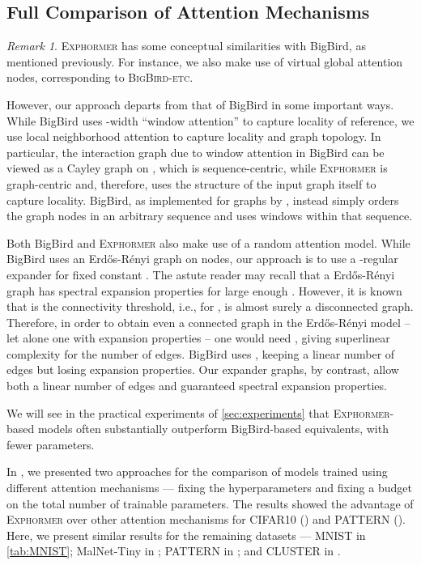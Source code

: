 \documentclass{article}
\theoremstyle{plain}
\theoremstyle{definition}
\theoremstyle{remark}
\newtheorem{remark}[theorem]{Remark}
\begin{document}
\subsection{Full Comparison of Attention Mechanisms} \label{app:attncomp}
\begin{remark}
\textsc{Exphormer} has some conceptual similarities with BigBird, as mentioned previously. For instance, we also make use of virtual global attention nodes, corresponding to \textsc{BigBird-etc}.

However, our approach departs from that of BigBird in some important ways. While BigBird uses -width ``window attention'' to capture locality of reference, we use local neighborhood attention to capture locality and graph topology. In particular, the interaction graph due to window attention in BigBird can be viewed as a Cayley graph on , which is sequence-centric, while \textsc{Exphormer} is graph-centric and, therefore, uses the structure of the input graph itself to capture locality.
BigBird, as implemented for graphs by \citet{RampasekGDLWB22}, instead simply orders the graph nodes in an arbitrary sequence and uses windows within that sequence.

Both BigBird and \textsc{Exphormer} also make use of a random attention model. While BigBird uses an Erd\H{o}s-R\'{e}nyi graph on  nodes, our approach is to use a -regular expander for fixed constant . The astute reader may recall that a Erd\H{o}s-R\'{e}nyi graph  has spectral expansion properties for large enough . However, it is known that  is the connectivity threshold, i.e., for ,  is almost surely a disconnected graph. Therefore, in order to obtain even a connected graph in the Erd\H{o}s-R\'{e}nyi model -- let alone one with expansion properties -- one would need , giving superlinear complexity for the number of edges.
BigBird uses , keeping a linear number of edges but losing expansion properties.
Our expander graphs, by contrast, allow both a linear number of edges and guaranteed spectral expansion properties.

We will see in the practical experiments of \cref{sec:experiments} that \textsc{Exphormer}-based models often substantially outperform BigBird-based equivalents, with fewer parameters.
\end{remark}


In , we presented two approaches for the comparison of models trained using different attention mechanisms --- fixing the hyperparameters and fixing a budget on the total number of trainable parameters. The results showed the advantage of \textsc{Exphormer} over other attention mechanisms for CIFAR10 () and PATTERN (). Here, we present similar results for the remaining datasets --- MNIST in \cref{tab:MNIST}; MalNet-Tiny in ; PATTERN in ; and CLUSTER in .
\end{document}
